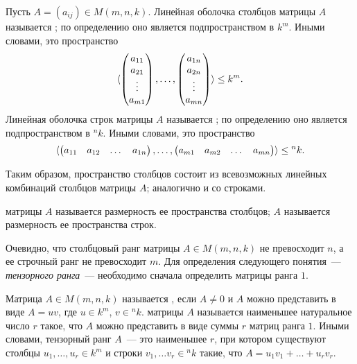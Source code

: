 \begin{definition}
Пусть $A=(a_{ij})\in M(m,n,k)$. Линейная оболочка столбцов матрицы $A$
называется ; по определению
оно является подпространством в $k^m$. Иными словами, это пространство
$$\langle\begin{pmatrix}a_{11}\\a_{21}\\\vdots\\a_{m1}\end{pmatrix},
\dots,
\begin{pmatrix}a_{1n}\\a_{2n}\\\vdots\\a_{mn}\end{pmatrix}\rangle\leq
k^m.$$
Линейная оболочка строк матрицы $A$ называется ; по
определению оно является подпространством в
${}^nk$. Иными словами, это пространство
$$\langle\begin{pmatrix}a_{11}&a_{12}&\dots&a_{1n}\end{pmatrix},\dots,
\begin{pmatrix}a_{m1}&a_{m2}&\dots&a_{mn}\end{pmatrix}\rangle\leq {}^nk.$$
\end{definition}
Таким образом, пространство столбцов состоит из всевозможных линейных
комбинаций столбцов матрицы $A$; аналогично и со строками.
\begin{definition}
 матрицы $A$ называется размерность ее
пространства столбцов;  $A$ называется
размерность ее пространства строк.
\end{definition}
Очевидно, что столбцовый ранг матрицы $A\in M(m,n,k)$ не превосходит
$n$, а ее строчный ранг не превосходит $m$.
Для определения следующего понятия~--- {\em тензорного ранга}~---
необходимо сначала определить матрицы ранга $1$.
\begin{definition}
Матрица $A\in M(m,n,k)$ называется , если
$A\neq 0$ и $A$ можно представить в виде $A=uv$, где $u\in k^m$, $v\in
{}^nk$.  матрицы $A$ называется наименьшее
натуральное число $r$ такое, что $A$ можно представить в виде суммы
$r$ матриц ранга $1$. Иными словами, тензорный ранг $A$~--- это
наименьшее $r$, при котором существуют столбцы $u_1,\dots,u_r\in k^m$
и строки $v_1,\dots v_r\in {}^nk$ такие, что $A=u_1v_1+\dots+u_rv_r$.
\end{definition}

